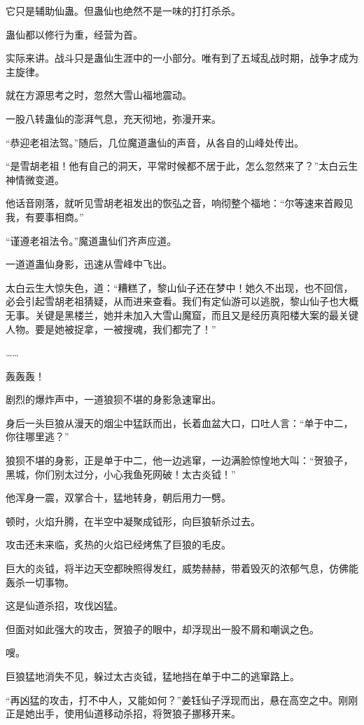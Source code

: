 \begin{this_body}
它只是辅助仙蛊。但蛊仙也绝然不是一味的打打杀杀。

蛊仙都以修行为重，经营为首。

实际来讲。战斗只是蛊仙生涯中的一小部分。唯有到了五域乱战时期，战争才成为主旋律。

就在方源思考之时，忽然大雪山福地震动。

一股八转蛊仙的澎湃气息，充天彻地，弥漫开来。

“恭迎老祖法驾。”随后，几位魔道蛊仙的声音，从各自的山峰处传出。

“是雪胡老祖！他有自己的洞天，平常时候都不居于此，怎么忽然来了？”太白云生神情微变道。

他话音刚落，就听见雪胡老祖发出的恢弘之音，响彻整个福地：“尔等速来首殿见我，有要事相商。”

“谨遵老祖法令。”魔道蛊仙们齐声应道。

一道道蛊仙身影，迅速从雪峰中飞出。

太白云生大惊失色，道：“糟糕了，黎山仙子还在梦中！她久不出现，也不回信，必会引起雪胡老祖猜疑，从而进来查看。我们有定仙游可以逃脱，黎山仙子也大概无事。关键是黑楼兰，她并未加入大雪山魔窟，而且又是经历真阳楼大案的最关键人物。要是她被捉拿，一被搜魂，我们都完了！”

……

轰轰轰！

剧烈的爆炸声中，一道狼狈不堪的身影急速窜出。

身后一头巨狼从漫天的烟尘中猛跃而出，长着血盆大口，口吐人言：“单于中二，你往哪里逃？”

狼狈不堪的身影，正是单于中二，他一边逃窜，一边满脸惊惶地大叫：“贺狼子，黑城，你们别太过分，小心我鱼死网破！太古炎钺！”

他浑身一震，双掌合十，猛地转身，朝后用力一劈。

顿时，火焰升腾，在半空中凝聚成钺形，向巨狼斩杀过去。

攻击还未来临，炙热的火焰已经烤焦了巨狼的毛皮。

巨大的炎钺，将半边天空都映照得发红，威势赫赫，带着毁灭的浓郁气息，仿佛能轰杀一切事物。

这是仙道杀招，攻伐凶猛。

但面对如此强大的攻击，贺狼子的眼中，却浮现出一股不屑和嘲讽之色。

嗖。

巨狼猛地消失不见，躲过太古炎钺，猛地挡在单于中二的逃窜路上。

“再凶猛的攻击，打不中人，又能如何？”姜钰仙子浮现而出，悬在高空之中。刚刚正是她出手，使用仙道移动杀招，将贺狼子挪移开来。


\end{this_body}
